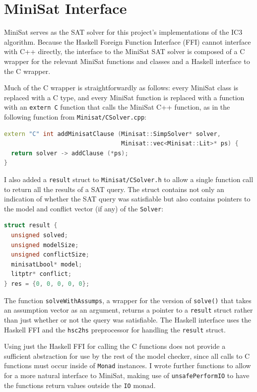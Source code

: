 \documentclass[12pt,a4paper,twoside,openright]{report}
\begin{document}
{\section{MiniSat Interface}
\label{impl:minisat}

MiniSat serves as the SAT solver for this project's implementations of the IC3 algorithm.
Because the Haskell Foreign Function Interface (FFI) cannot interface with C++ directly,
the interface to the MiniSat SAT solver is composed of a C wrapper for the relevant
MiniSat functions and classes and a Haskell interface to the C wrapper.

Much of the C wrapper is straightforwardly as follows:
every MiniSat class is replaced with a C
type, and every MiniSat function is replaced with a function with an \verb,extern C, function that
calls the MiniSat C++ function, as in the following function
from \verb,Minisat/CSolver.cpp,:
\begin{lstlisting}[language = C++]
extern "C" int addMinisatClause (Minisat::SimpSolver* solver,
                                 Minisat::vec<Minisat::Lit>* ps) {
  return solver -> addClause (*ps);
}
\end{lstlisting}

I also added a \verb,result, struct to \verb,Minisat/CSolver.h, to
allow a single function call to return
all the results of a SAT query. The struct contains not only an indication of
whether the SAT query was satisfiable but also contains pointers to the model and conflict vector (if any) of the \verb,Solver,:
\begin{lstlisting}[language=C]
struct result {
  unsigned solved;
  unsigned modelSize;
  unsigned conflictSize;
  minisatLbool* model;
  litptr* conflict;
} res = {0, 0, 0, 0, 0};
\end{lstlisting}

The function \verb,solveWithAssumps,, a wrapper for the version of \verb,solve(),
that takes an assumption vector as an argument, returns a pointer to a
\verb,result, struct rather than just whether or not the query was satisfiable.
The Haskell interface uses the Haskell FFI and the \verb,hsc2hs, preprocessor
for handling the \verb,result, struct.

Using just the Haskell FFI for calling the C functions does not provide a
sufficient abstraction for use by the rest of the model checker, since all
calls to C functions must occur inside of \verb,Monad, instances.
I wrote further functions to allow for a more natural interface to MiniSat,
making use of \verb,unsafePerformIO, to have the functions return
values outside the \verb,IO, monad.

}
\end{document}
